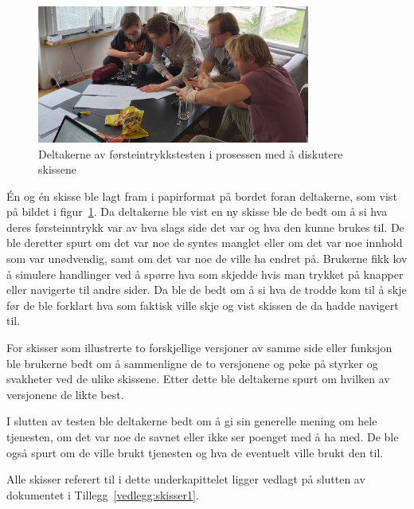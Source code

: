 
\begin{figure}[H]
\includegraphics[width=0.8\textwidth]{Illustrasjoner/skissetest-bilde.jpg}
\centering
\caption{Deltakerne av førsteintrykkstesten i prosessen med å diskutere skissene}
\label{fig:skissetest}
\end{figure}

Én og én skisse ble lagt fram i papirformat på bordet foran deltakerne, som vist på bildet i figur~\ref{fig:skissetest}. Da deltakerne ble vist en ny skisse ble de bedt om å si hva deres førsteinntrykk var av hva slags side det var og hva den kunne brukes til. De ble deretter spurt om det var noe de syntes manglet eller om det var noe innhold som var unødvendig, samt om det var noe de ville ha endret på. Brukerne fikk lov å simulere handlinger ved å spørre hva som skjedde hvis man trykket på knapper eller navigerte til andre sider. Da ble de bedt om å si hva de trodde kom til å skje før de ble forklart hva som faktisk ville skje og vist skissen de da hadde navigert til.

For skisser som illustrerte to forskjellige versjoner av samme side eller funksjon ble brukerne bedt om å sammenligne de to versjonene og peke på styrker og svakheter ved de ulike skissene. Etter dette ble deltakerne spurt om hvilken av versjonene de likte best.

I slutten av testen ble deltakerne bedt om å gi sin generelle mening om hele tjenesten, om det var noe de savnet eller ikke ser poenget med å ha med. De ble også spurt om de ville brukt tjenesten og hva de eventuelt ville brukt den til.

Alle skisser referert til i dette underkapittelet ligger vedlagt på slutten av dokumentet i Tillegg~\ref{vedlegg:skisser1}.



